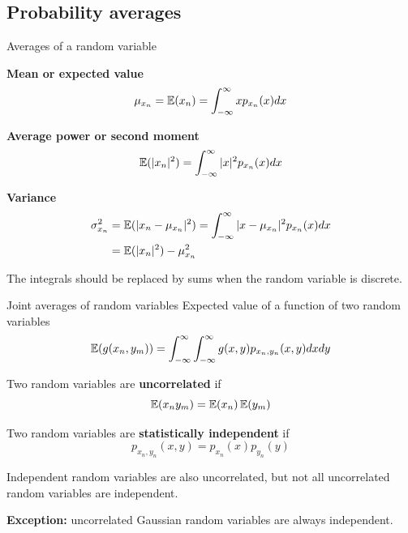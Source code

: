 \documentclass[10pt]{beamer}
\begin{document}
\subsection{Probability averages}
\begin{frame}{Averages of a random variable}

\textbf{Mean or expected value}
\begin{equation*}
	\mu_{x_n} = \operatorname{\mathbb{E}}(x_n) = \int_{-\infty}^{\infty}xp_{x_n}(x)dx
\end{equation*}

\pause
\textbf{Average power or second moment}
\begin{equation*} 
	\operatorname{\mathbb{E}}(|x_n|^2) = \int_{-\infty}^{\infty}|x|^2p_{x_n}(x)dx
\end{equation*}

\pause
\textbf{Variance}
\begin{align*}
\sigma^2_{x_n} &= \operatorname{\mathbb{E}}(|x_n-\mu_{x_n}|^2) = \int_{-\infty}^{\infty}|x-\mu_{x_n}|^2p_{x_n}(x)dx \\
&= \operatorname{\mathbb{E}}(|x_n|^2) - \mu_{x_n}^2
\end{align*}

The integrals should be replaced by sums when the random variable is discrete.

\end{frame}

\begin{frame}{Joint averages of random variables}
Expected value of a function of two random variables
\begin{equation*}
\operatorname{\mathbb{E}}(g(x_n,y_m)) = \int_{-\infty}^{\infty}\int_{-\infty}^{\infty}g(x, y)p_{x_n, y_n}(x, y)dxdy
\end{equation*}

\pause
Two random variables are \textbf{uncorrelated} if
\begin{equation*}
\operatorname{\mathbb{E}}(x_ny_m) = \operatorname{\mathbb{E}}(x_n)\operatorname{\mathbb{E}}(y_m)
\end{equation*}

\pause
Two random variables are \textbf{statistically independent} if
\begin{equation*}
p_{x_n, y_n}(x,y) = p_{x_n}(x)p_{y_n}(y)
\end{equation*}

Independent random variables are also uncorrelated, but not all uncorrelated random variables are independent.

\textbf{Exception:} uncorrelated Gaussian random variables are always independent.
\end{frame}
\end{document}
